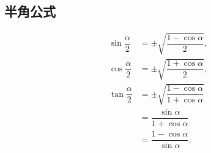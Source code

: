 \documentclass[titlepage]{ctexart}
\begin{document}
\subsection{半角公式}

\begin{align*}
    \sin \dfrac{\alpha}{2} &= \pm \sqrt{\dfrac{1 - \cos \alpha}{2}}, \\
    \cos \dfrac{\alpha}{2} &= \pm \sqrt{\dfrac{1 + \cos \alpha}{2}}, \\
    \tan \dfrac{\alpha}{2} &= \pm \sqrt{\dfrac{1 - \cos \alpha}{1 + \cos \alpha}} \\
                           &= \dfrac{\sin \alpha}{1 + \cos \alpha} \\
                           &= \dfrac{1 - \cos \alpha}{\sin \alpha}.
\end{align*}
\end{document}
